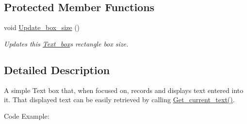 \subsection*{Protected Member Functions}
\begin{DoxyCompactItemize}
\item 
void \hyperlink{classjetfuel_1_1gui_1_1Text__box_a5fe0ab8595f220ce22945e126e0b79bd}{Update\+\_\+box\+\_\+size} ()
\begin{DoxyCompactList}\small\item\em Updates this \hyperlink{classjetfuel_1_1gui_1_1Text__box}{Text\+\_\+box}\textquotesingle{}s rectangle box size. \end{DoxyCompactList}\end{DoxyCompactItemize}


\subsection{Detailed Description}
A simple Text box that, when focused on, records and displays text entered into it. That displayed text can be easily retrieved by calling \hyperlink{classjetfuel_1_1gui_1_1Text__box_ac68da2c696932b9ac32fb8f463239079}{Get\+\_\+current\+\_\+text()}.

Code Example\+:


